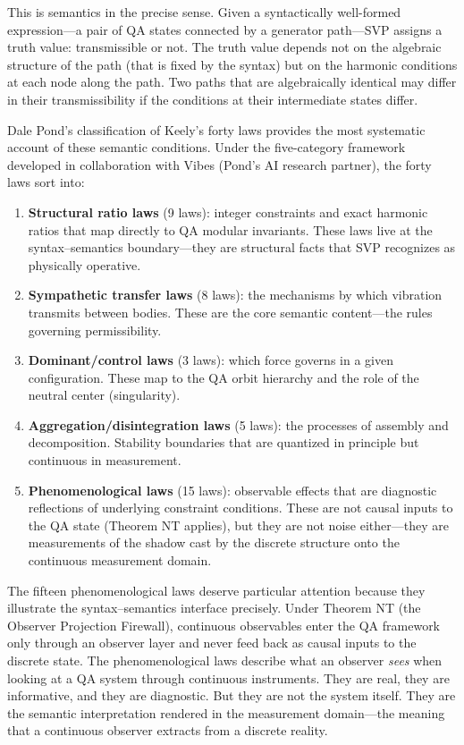 \documentclass[11pt,a4paper]{article}
\begin{document}
This is semantics in the precise sense. Given a syntactically well-formed
expression---a pair of QA states connected by a generator path---SVP
assigns a truth value: transmissible or not. The truth value depends not
on the algebraic structure of the path (that is fixed by the syntax) but
on the harmonic conditions at each node along the path. Two paths that are
algebraically identical may differ in their transmissibility if the
conditions at their intermediate states differ.

Dale Pond's classification of Keely's forty laws provides the most
systematic account of these semantic conditions. Under the five-category
framework developed in collaboration with Vibes (Pond's AI research
partner), the forty laws sort into:

\begin{enumerate}
\item \textbf{Structural ratio laws} (9 laws): integer constraints and
exact harmonic ratios that map directly to QA modular invariants. These
laws live at the syntax--semantics boundary---they are structural facts
that SVP recognizes as physically operative.
\item \textbf{Sympathetic transfer laws} (8 laws): the mechanisms by
which vibration transmits between bodies. These are the core semantic
content---the rules governing permissibility.
\item \textbf{Dominant/control laws} (3 laws): which force governs in a
given configuration. These map to the QA orbit hierarchy and the role of
the neutral center (singularity).
\item \textbf{Aggregation/disintegration laws} (5 laws): the processes
of assembly and decomposition. Stability boundaries that are quantized
in principle but continuous in measurement.
\item \textbf{Phenomenological laws} (15 laws): observable effects that
are diagnostic reflections of underlying constraint conditions. These
are not causal inputs to the QA state (Theorem NT applies), but they
are not noise either---they are measurements of the shadow cast by the
discrete structure onto the continuous measurement domain.
\end{enumerate}

The fifteen phenomenological laws deserve particular attention because they
illustrate the syntax--semantics interface precisely. Under Theorem NT
(the Observer Projection Firewall), continuous observables enter the QA
framework only through an observer layer and never feed back as causal
inputs to the discrete state. The phenomenological laws describe what an
observer \emph{sees} when looking at a QA system through continuous
instruments. They are real, they are informative, and they are diagnostic.
But they are not the system itself. They are the semantic interpretation
rendered in the measurement domain---the meaning that a continuous
observer extracts from a discrete reality.
\end{document}
